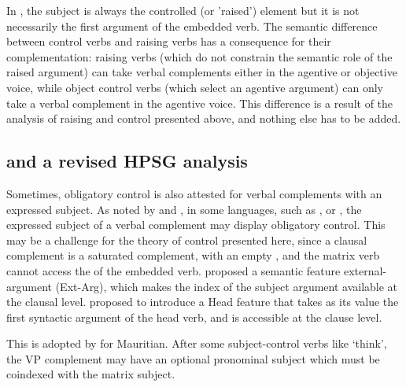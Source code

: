 \documentclass[output=paper
	        ,collection
	        ,collectionchapter
 	        ,biblatex
                ,babelshorthands
                ,newtxmath
                ,draftmode
                ,colorlinks, citecolor=brown
]{langscibook}
\begin{document}
In , the subject is always the controlled (or 'raised') element but it is not necessarily the first argument of the embedded verb. The semantic difference between control verbs and raising verbs has a consequence for their complementation: raising verbs (which do not constrain the semantic role of the raised argument) can take verbal complements either in the agentive or objective voice, while object control verbs (which select an agentive argument) can only take a verbal complement in the agentive voice. This difference is a result of the analysis of raising and control presented above, and nothing else has to be added.



\subsection{\xarg and a revised HPSG analysis}\label{section-xarg}

Sometimes, obligatory control is also attested for verbal complements with an expressed subject. 
As noted by \citet{Zec87a-u,Farkas1988} and \citet[--116]{GH2001a-u}, in some languages,  such as ,   \citep{Kuno76a-u,Iida96a-u} or  \citep{Karimi2008},  the expressed subject of a verbal complement
may display obligatory control. This may be a challenge for the theory of control presented here, since a clausal complement is a
saturated complement, with an empty \subjl, and the matrix verb cannot access the \subjv of the
embedded verb. \citet[]{SP91a-u} proposed a semantic feature external-argument (Ext-Arg), which makes the index of the subject argument available at the clausal level.  \citet{Sag2007a} proposed to introduce a Head
feature \xarg that takes as its value the first syntactic argument of the head verb, and is
accessible at the clause level. 

This is adopted by \citet{HenriandLaurens2011} for Mauritian.  After some subject-control verbs
like  `think', the VP complement may have an optional pronominal subject which must be coindexed with the matrix subject. 
\end{document}
